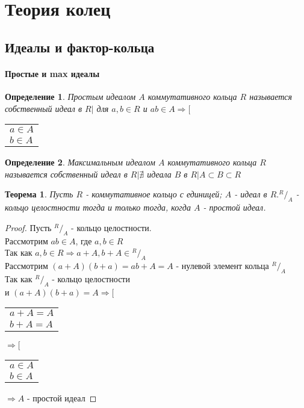 \documentclass[10pt,a4paper]{article}
\newtheorem{definition}{Определение}
\newtheorem{theorem}{Теорема}
\begin{document}
	\setcounter{section}{1}
	\section{Теория колец}
		\setcounter{subsection}{2}
		\subsection{Идеалы и фактор-кольца}
			\paragraph{Простые и max идеалы}
				\begin{definition}
					Простым идеалом $A$ коммутативного кольца $R$ называется собственный идеал в $R \big|$ для $a, b \in R$ и $ab \in A \Rightarrow \Big[$
					\begin{tabular}{l}
						$a \in A$\\
						$b \in A$
					\end{tabular}
				\end{definition}
				\begin{definition}					
					Максимальным идеалом $A$ коммутативного кольца $R$ называется собственный идеал в $R \big| \nexists$ идеала $B$ в $R \big| A \subset B \subset R$
				\end{definition}
				\begin{theorem}
					Пусть $R$ - коммутативное кольцо с единицей; $A$ - идеал в $R. {}^R/_A$ - кольцо целостности тогда и только тогда, когда $A$ - простой идеал.
				\end{theorem}
				\begin{proof}
					Пусть ${}^R/_A$ - кольцо целостности.\\
					Рассмотрим $ab \in A$, где $a, b \in R$\\
					Так как $a, b \in R \Rightarrow a+A, b+A \in {}^R/_A$\\
					Рассмотрим $(a+A)(b+a) = ab+A = A$ - нулевой элемент кольца ${}^R/_A$\\
					Так как ${}^R/_A$ - кольцо целостности\\
					и $(a+A)(b+a) = A \Rightarrow \Big[$
					\begin{tabular}{l}
						$a+A = A$\\
						$b+A = A$
					\end{tabular}
					$\Rightarrow \Big[$
					\begin{tabular}{l}
						$a \in A$\\
						$b \in A$
					\end{tabular}
					$\Rightarrow A$ - простой идеал
				\end{proof}
\end{document}
